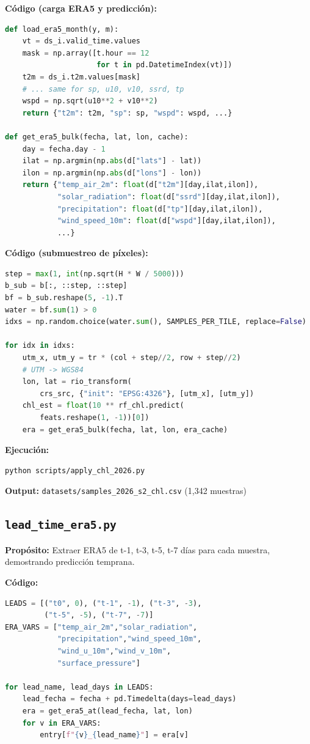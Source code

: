 \documentclass[12pt]{article}
\begin{document}
\textbf{C\'odigo (carga ERA5 y predicci\'on):}
\begin{lstlisting}[language=Python]
def load_era5_month(y, m):
    vt = ds_i.valid_time.values
    mask = np.array([t.hour == 12
                     for t in pd.DatetimeIndex(vt)])
    t2m = ds_i.t2m.values[mask]
    # ... same for sp, u10, v10, ssrd, tp
    wspd = np.sqrt(u10**2 + v10**2)
    return {"t2m": t2m, "sp": sp, "wspd": wspd, ...}

def get_era5_bulk(fecha, lat, lon, cache):
    day = fecha.day - 1
    ilat = np.argmin(np.abs(d["lats"] - lat))
    ilon = np.argmin(np.abs(d["lons"] - lon))
    return {"temp_air_2m": float(d["t2m"][day,ilat,ilon]),
            "solar_radiation": float(d["ssrd"][day,ilat,ilon]),
            "precipitation": float(d["tp"][day,ilat,ilon]),
            "wind_speed_10m": float(d["wspd"][day,ilat,ilon]),
            ...}
\end{lstlisting}

\textbf{C\'odigo (submuestreo de p\'ixeles):}
\begin{lstlisting}[language=Python]
step = max(1, int(np.sqrt(H * W / 5000)))
b_sub = b[:, ::step, ::step]
bf = b_sub.reshape(5, -1).T
water = bf.sum(1) > 0
idxs = np.random.choice(water.sum(), SAMPLES_PER_TILE, replace=False)

for idx in idxs:
    utm_x, utm_y = tr * (col + step//2, row + step//2)
    # UTM -> WGS84
    lon, lat = rio_transform(
        crs_src, {"init": "EPSG:4326"}, [utm_x], [utm_y])
    chl_est = float(10 ** rf_chl.predict(
        feats.reshape(1, -1))[0])
    era = get_era5_bulk(fecha, lat, lon, era_cache)
\end{lstlisting}

\textbf{Ejecuci\'on:}
\begin{lstlisting}
python scripts/apply_chl_2026.py
\end{lstlisting}
\textbf{Output:} \texttt{datasets/samples\_2026\_s2\_chl.csv} (1,342 muestras)

\subsection{\texttt{lead\_time\_era5.py}}
\textbf{Prop\'osito:} Extraer ERA5 de t-1, t-3, t-5, t-7 d\'ias para cada muestra, demostrando predicci\'on temprana.

\textbf{C\'odigo:}
\begin{lstlisting}[language=Python]
LEADS = [("t0", 0), ("t-1", -1), ("t-3", -3),
         ("t-5", -5), ("t-7", -7)]
ERA_VARS = ["temp_air_2m","solar_radiation",
            "precipitation","wind_speed_10m",
            "wind_u_10m","wind_v_10m",
            "surface_pressure"]

for lead_name, lead_days in LEADS:
    lead_fecha = fecha + pd.Timedelta(days=lead_days)
    era = get_era5_at(lead_fecha, lat, lon)
    for v in ERA_VARS:
        entry[f"{v}_{lead_name}"] = era[v]
\end{lstlisting}
\end{document}
